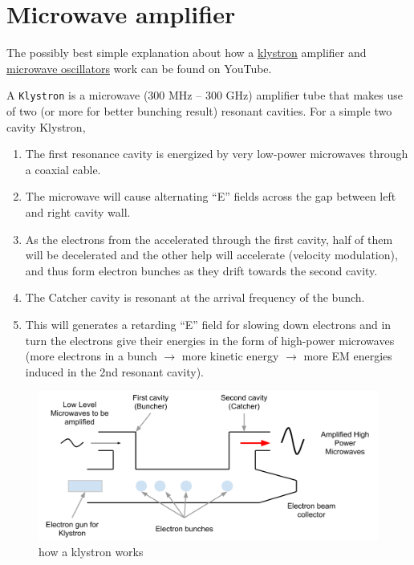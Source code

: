 \documentclass[]{book}
\providecommand{\tightlist}{%
  \setlength{\itemsep}{0pt}\setlength{\parskip}{0pt}}
\theoremstyle{definition}
\theoremstyle{definition}
\theoremstyle{definition}
\theoremstyle{remark}
\begin{document}
\section{Microwave amplifier}\label{microwave-amplifier}

The possibly best simple explanation about how a
\href{https://www.youtube.com/watch?v=Fvud81pYGOg}{klystron} amplifier
and \href{https://www.youtube.com/watch?v=VkpEQZEGSkE\&t=108s}{microwave
oscillators} work can be found on YouTube.

A \texttt{Klystron} is a microwave (300 MHz -- 300 GHz) amplifier tube
that makes use of two (or more for better bunching result) resonant
cavities. For a simple two cavity Klystron,

\begin{enumerate}
\def\labelenumi{\arabic{enumi}.}
\tightlist
\item
  The first resonance cavity is energized by very low-power microwaves
  through a coaxial cable.
\item
  The microwave will cause alternating ``E'' fields across the gap
  between left and right cavity wall.
\item
  As the electrons from the accelerated through the first cavity, half
  of them will be decelerated and the other help will accelerate
  (velocity modulation), and thus form electron bunches as they drift
  towards the second cavity.
\item
  The Catcher cavity is resonant at the arrival frequency of the bunch.
\item
  This will generates a retarding ``E'' field for slowing down electrons
  and in turn the electrons give their energies in the form of
  high-power microwaves (more electrons in a bunch \(\rightarrow\) more
  kinetic energy \(\rightarrow\) more EM energies induced in the 2nd
  resonant cavity).
\end{enumerate}

\begin{figure}

{\centering \includegraphics{figures/klystron} 

}

\caption{how a klystron works}\label{fig:unnamed-chunk-4}
\end{figure}
\end{document}
